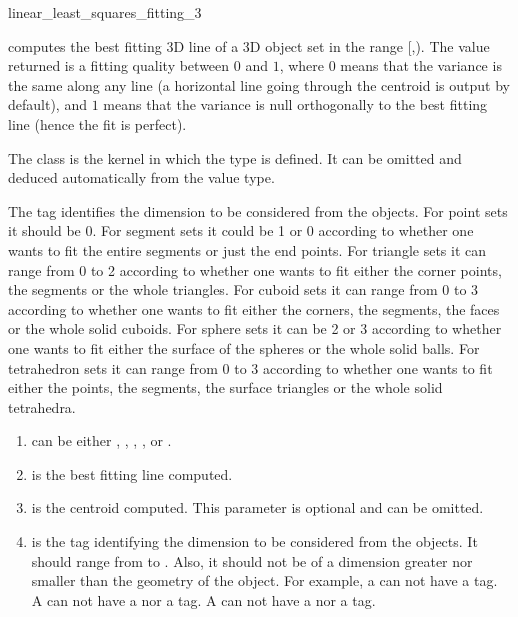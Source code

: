 \begin{ccRefFunction}{linear_least_squares_fitting_3}

{ computes the best fitting 3D line of a 3D object set in the range
[,). The value returned is a fitting quality
between $0$ and $1$, where $0$ means that the variance is the same
along any line (a horizontal line going through the centroid is output
by default), and $1$ means that the variance is null orthogonally
to the best fitting line (hence the fit is perfect). }

The class  is the kernel in which the type  is defined. It can be omitted and deduced automatically from the value type.

The tag  identifies the dimension to be considered from the objects. For point sets it should be 0. For segment sets it could be 1 or 0 according to whether one wants to fit the entire segments or just the end points. For triangle sets it can range from 0 to 2 according to whether one wants to fit either the corner points, the segments or the whole triangles. For cuboid sets it can range from 0 to 3 according to whether one wants to fit either the corners, the segments, the faces or the whole solid cuboids. For sphere sets it can be 2 or 3 according to whether one wants to fit either the surface of the spheres or the whole solid balls. For tetrahedron sets it can range from 0 to 3 according to whether one wants to fit either the points, the segments, the surface triangles or the whole solid tetrahedra.


\begin{enumerate}
   \item  {} can be either , 
          , , ,
           or .
   \item  {} is the best fitting line computed.
   \item  {} is the centroid computed. This parameter is optional and can be omitted.
   \item  {} is the tag identifying the dimension to be considered from the objects. It should range from  to . Also, it should not be of a dimension greater nor smaller than the geometry of the object. For example, a  can not have a  tag. A  can not have a  nor a  tag. A  can not have a  nor a  tag.
\end{enumerate}



\end{ccRefFunction}
